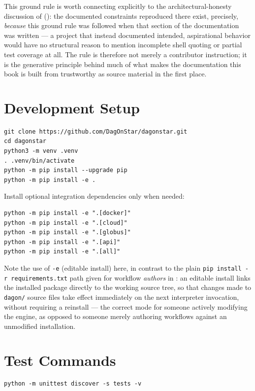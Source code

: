 This ground rule is worth connecting explicitly to the architectural-honesty
discussion of  (): the
documented constraints reproduced there exist, precisely, \emph{because}
this ground rule was followed when that section of the documentation was
written --- a project that instead documented intended, aspirational
behavior would have no structural reason to mention incomplete shell
quoting or partial test coverage at all. The rule is therefore not merely a
contributor instruction; it is the generative principle behind much of what
makes the documentation this book is built from trustworthy as source
material in the first place.

\section{Development Setup}

\begin{lstlisting}[style=bash]
git clone https://github.com/DagOnStar/dagonstar.git
cd dagonstar
python3 -m venv .venv
. .venv/bin/activate
python -m pip install --upgrade pip
python -m pip install -e .
\end{lstlisting}

Install optional integration dependencies only when needed:

\begin{lstlisting}[style=bash]
python -m pip install -e ".[docker]"
python -m pip install -e ".[cloud]"
python -m pip install -e ".[globus]"
python -m pip install -e ".[api]"
python -m pip install -e ".[all]"
\end{lstlisting}

Note the use of \texttt{-e} (editable install) here, in contrast to the
plain \texttt{pip install -r requirements.txt} path given for workflow
\emph{authors} in : an editable install links the
installed package directly to the working source tree, so that changes made
to \texttt{dagon/} source files take effect immediately on the next
interpreter invocation, without requiring a reinstall --- the correct mode
for someone actively modifying the engine, as opposed to someone merely
authoring workflows against an unmodified installation.

\section{Test Commands}

\begin{lstlisting}[style=bash, caption={Run unit tests.}]
python -m unittest discover -s tests -v
\end{lstlisting}

